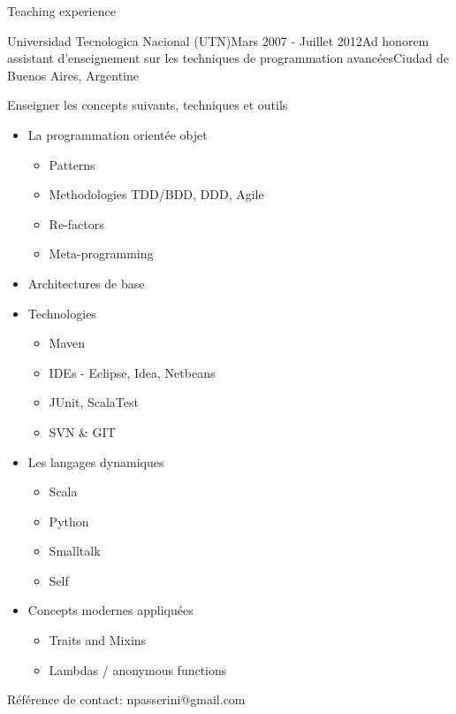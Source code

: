 \documentclass{resume} %
\begin{document}

\begin{rSection}{Teaching experience}


\begin{rSubsection}{Universidad Tecnologica Nacional (UTN)}{Mars 2007 - Juillet 2012}{Ad honorem assistant d'enseignement sur les techniques de programmation avanc\'{e}es}{Ciudad de Buenos Aires, Argentine}
\item Enseigner les concepts suivants, techniques et outils
\begin{itemize}
	\item La programmation orient\'{e}e objet
	\begin{itemize}
		\item Patterns
		\item Methodologies TDD/BDD, DDD, Agile
		\item Re-factors
		\item Meta-programming
	\end{itemize}
	\item Architectures de base
	\item Technologies
	\begin{itemize}
		\item Maven 
		\item IDEs - Eclipse, Idea, Netbeans
		\item JUnit, ScalaTest
		\item SVN \& GIT
	\end{itemize}
	\item Les langages dynamiques
	\begin{itemize}
		\item  Scala
		\item  Python
		\item  Smalltalk
		\item  Self
	\end{itemize}
	\item Concepts modernes appliqu\'{e}es
	\begin{itemize}
		\item Traits and Mixins
		\item  Lambdas / anonymous functions
	\end{itemize}
\end{itemize}
\item R\'{e}f\'{e}rence de contact: npasserini@gmail.com
\end{rSubsection}


\end{rSection}
\end{document}
